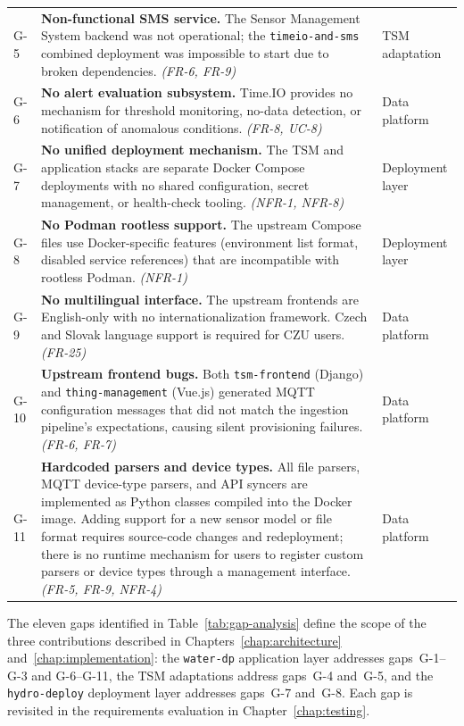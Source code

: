 \begin{longtable}{l p{} l}
  G-5 & \textbf{Non-functional SMS service.} The Sensor Management System
        backend was not operational; the \texttt{timeio-and-sms} combined
        deployment was impossible to start due to broken dependencies.
        \emph{(FR-6, FR-9)} & TSM adaptation \\[6pt]

  G-6 & \textbf{No alert evaluation subsystem.} Time.IO provides no mechanism
        for threshold monitoring, no-data detection, or notification of
        anomalous conditions.
        \emph{(FR-8, UC-8)} & Data platform \\[6pt]

  G-7 & \textbf{No unified deployment mechanism.} The TSM and application
        stacks are separate Docker Compose deployments with no shared
        configuration, secret management, or health-check tooling.
        \emph{(NFR-1, NFR-8)} & Deployment layer \\[6pt]

  G-8 & \textbf{No Podman rootless support.} The upstream Compose files use
        Docker-specific features (environment list format, disabled service
        references) that are incompatible with rootless Podman.
        \emph{(NFR-1)} & Deployment layer \\[6pt]

  G-9 & \textbf{No multilingual interface.} The upstream frontends are
        English-only with no internationalization framework. Czech and Slovak
        language support is required for CZU users.
        \emph{(FR-25)} & Data platform \\[6pt]

  G-10 & \textbf{Upstream frontend bugs.} Both \texttt{tsm-frontend} (Django)
         and \texttt{thing-management} (Vue.js) generated MQTT configuration
         messages that did not match the ingestion pipeline's expectations,
         causing silent provisioning failures.
         \emph{(FR-6, FR-7)} & Data platform \\[6pt]

  G-11 & \textbf{Hardcoded parsers and device types.} All file parsers, MQTT
         device-type parsers, and API syncers are implemented as Python classes
         compiled into the Docker image. Adding support for a new sensor model
         or file format requires source-code changes and redeployment; there is
         no runtime mechanism for users to register custom parsers or device
         types through a management interface.
         \emph{(FR-5, FR-9, NFR-4)} & Data platform \\

\end{longtable}

The eleven gaps identified in Table~\ref{tab:gap-analysis} define the scope of the three
contributions described in Chapters~\ref{chap:architecture} and~\ref{chap:implementation}:
the \texttt{water-dp} application layer addresses gaps~G-1--G-3 and G-6--G-11,
the TSM adaptations address gaps~G-4 and~G-5, and the \texttt{hydro-deploy} deployment
layer addresses gaps~G-7 and~G-8. Each gap is revisited in the requirements evaluation
in Chapter~\ref{chap:testing}.
